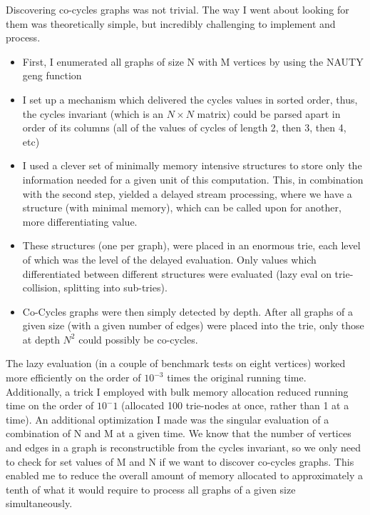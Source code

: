 Discovering co-cycles graphs was not trivial.
The way I went about looking for them was theoretically simple, but incredibly challenging to implement and process.
\begin{itemize}
\item{First, I enumerated all graphs of size N with M vertices by using the NAUTY geng function}
\item{I set up a mechanism which delivered the cycles values in sorted order, thus, the cycles invariant (which is an $N \times N$ matrix) could be parsed apart in order of its columns (all of the values of cycles of length 2, then 3, then 4, etc)}
\item{I used a clever set of minimally memory intensive structures to store only the information needed for a given unit of this computation.  This, in combination with the second step, yielded a delayed stream processing, where we have a structure (with minimal memory), which can be called upon for another, more differentiating value.}
\item{These structures (one per graph), were placed in an enormous trie, each level of which was the level of the delayed evaluation.  Only values which differentiated between different structures were evaluated (lazy eval on trie-collision, splitting into sub-tries).}
\item{Co-Cycles graphs were then simply detected by depth. After all graphs of a given size (with a given number of edges) were placed into the trie, only those at depth $N^2$ could possibly be co-cycles.}
\end{itemize}

The lazy evaluation (in a couple of benchmark tests on eight vertices) worked more efficiently on the order of $10^{-3}$ times the original running time.
Additionally, a trick I employed with bulk memory allocation reduced running time on the order of $10^-1$ (allocated 100 trie-nodes at once, rather than 1 at a time).
An additional optimization I made was the singular evaluation of a combination of N and M at a given time.
We know that the number of vertices and edges in a graph is reconstructible from the cycles invariant, so we only need to check for set values of M and N if we want to discover co-cycles graphs.
This enabled me to reduce the overall amount of memory allocated to approximately a tenth of what it would require to process all graphs of a given size simultaneously.

